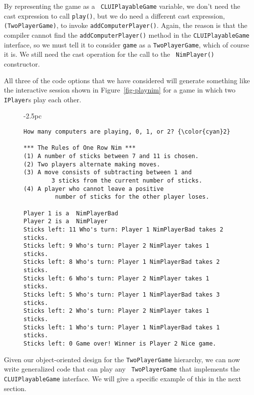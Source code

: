 \noindent By representing the game as a {\tt
CLUIPlayableGame} variable, we don't need the cast expression to call
{\tt play()}, but we do need a different cast expression, {\tt
(TwoPlayerGame)}, to invoke {\tt addComputerPlayer()}.  Again, the
reason is that the compiler cannot find the {\tt add\-Computer\-Player()}
method in the {\tt CLUIPlayableGame} interface, so we must tell it to
consider {\tt game} as a {\tt TwoPlayerGame}, which of course it
is. We still need the cast operation for the call to the {\tt
NimPlayer()} constructor.

All three of the code options that we have considered will generate
something like the interactive session shown in
Figure~\ref{fig-playnim} for a game in which two {\tt IPlayer}s play
each other.


\begin{figure}[h]
\jjjprogstart
\begin{jjjlistingleft}[28.5pc]{-2.5pc}
\begin{lstlisting}[stringstyle=\color{black}]
How many computers are playing, 0, 1, or 2? {\color{cyan}2}

*** The Rules of One Row Nim ***
(1) A number of sticks between 7 and 11 is chosen.
(2) Two players alternate making moves.
(3) A move consists of subtracting between 1 and
        3 sticks from the current number of sticks.
(4) A player who cannot leave a positive
         number of sticks for the other player loses.

Player 1 is a  NimPlayerBad
Player 2 is a  NimPlayer
Sticks left: 11 Who's turn: Player 1 NimPlayerBad takes 2 sticks.
Sticks left: 9 Who's turn: Player 2 NimPlayer takes 1 sticks.
Sticks left: 8 Who's turn: Player 1 NimPlayerBad takes 2 sticks.
Sticks left: 6 Who's turn: Player 2 NimPlayer takes 1 sticks.
Sticks left: 5 Who's turn: Player 1 NimPlayerBad takes 3 sticks.
Sticks left: 2 Who's turn: Player 2 NimPlayer takes 1 sticks.
Sticks left: 1 Who's turn: Player 1 NimPlayerBad takes 1 sticks.
Sticks left: 0 Game over! Winner is Player 2 Nice game.
\end{lstlisting}
\end{jjjlistingleft}
\end{figure}

Given our object-oriented design for the {\tt TwoPlayerGame}
hierarchy, we can now write generalized code that can play any {\tt
TwoPlayerGame} that implements the {\tt CLUIPlayableGame}
interface. We will give a specific example of this in the next
section.

